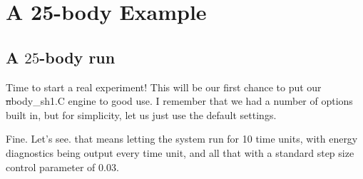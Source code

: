 \chapter{A 25-body Example}

\section{A $25$-body run}

\abc

\bob
Time to start a real experiment!  This will be our first chance to put
our {\st nbody\_sh1.C} engine to good use.  I remember that we had a
number of options built in, but for simplicity, let us just use the
default settings.

\carol
Fine.  Let's see. that means letting the system run for 10 time units,
with energy diagnostics being output every time unit, and all that
with a standard step size control parameter of 0.03.

\cba


